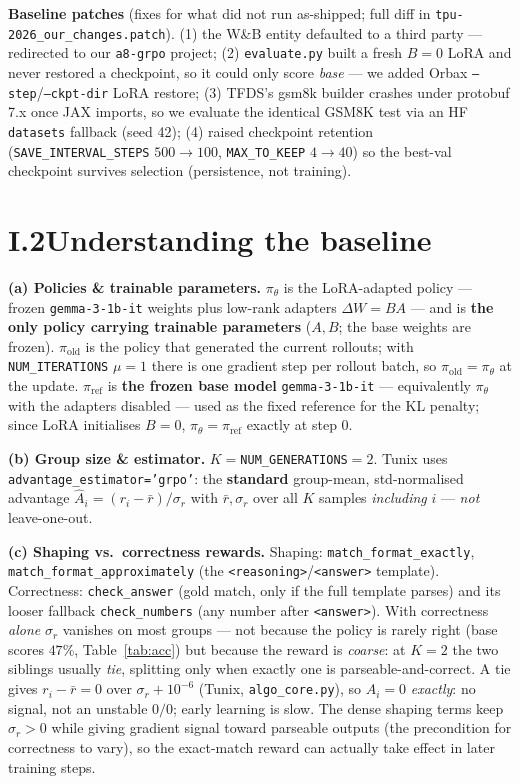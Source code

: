 \documentclass[11pt]{article}
\newcommand{\code}[1]{\texttt{#1}}
\begin{document}
\textbf{Baseline patches} (fixes for what did not run as-shipped; full diff in \code{tpu-2026\_our\_changes.patch}).
(1) the W\&B entity defaulted to a third party --- redirected to our \code{a8-grpo} project;
(2) \code{evaluate.py} built a fresh $B{=}0$ LoRA and never restored a checkpoint, so it could only score \emph{base} --- we added Orbax
\code{--step}/\code{--ckpt-dir} LoRA restore;
(3) TFDS's gsm8k builder crashes under protobuf 7.x once JAX imports, so we evaluate the identical GSM8K test via an HF \code{datasets} fallback (seed 42);
(4) raised checkpoint retention (\code{SAVE\_INTERVAL\_STEPS} $500{\to}100$, \code{MAX\_TO\_KEEP} $4{\to}40$) so the best-val checkpoint survives selection (persistence, not training).

\section*{I.2\quad Understanding the baseline}
\textbf{(a) Policies \& trainable parameters.} $\pi_\theta$ is the LoRA-adapted policy --- frozen \code{gemma-3-1b-it} weights plus low-rank
adapters $\Delta W{=}BA$ --- and is \textbf{the only policy carrying trainable parameters} ($A,B$; the base weights are frozen). $\pi_{\mathrm{old}}$
is the policy that generated the current rollouts; with \code{NUM\_ITERATIONS} $\mu{=}1$ there is one gradient step per rollout batch, so
$\pi_{\mathrm{old}}{=}\pi_\theta$ at the update. $\pi_{\mathrm{ref}}$ is \textbf{the frozen base model} \code{gemma-3-1b-it} --- equivalently $\pi_\theta$
with the adapters disabled --- used as the fixed reference for the KL penalty; since LoRA initialises $B{=}0$, $\pi_\theta{=}\pi_{\mathrm{ref}}$ exactly at step 0.

\textbf{(b) Group size \& estimator.} $K{=}$\code{NUM\_GENERATIONS}$=2$. Tunix uses \code{advantage\_estimator='grpo'}: the \textbf{standard}
group-mean, std-normalised advantage $\hat A_i{=}(r_i-\bar r)/\sigma_r$ with $\bar r,\sigma_r$ over all $K$ samples \emph{including} $i$ --- \emph{not}
leave-one-out.

\textbf{(c) Shaping vs.\ correctness rewards.} Shaping: \code{match\_format\_exactly}, \code{match\_format\_approximately} (the
\code{<reasoning>}/\code{<answer>} template). Correctness: \code{check\_answer} (gold match, only if the full template parses) and its looser fallback \code{check\_numbers} (any number
after \code{<answer>}). With correctness \emph{alone} $\sigma_r$ vanishes on most groups --- not because the policy is rarely right (base scores $47\%$,
Table~\ref{tab:acc}) but because the reward is \emph{coarse}: at $K{=}2$ the two siblings usually \emph{tie}, splitting only when exactly one is
parseable-and-correct. A tie gives $r_i{-}\bar r{=}0$ over $\sigma_r{+}10^{-6}$ (Tunix, \code{algo\_core.py}), so $\hat A_i{=}0$ \emph{exactly}: no signal,
not an unstable $0/0$; early learning is slow. The dense shaping
terms keep $\sigma_r{>}0$ while giving gradient signal toward parseable outputs (the precondition for correctness to vary), so the exact-match
reward can actually take effect in later training steps.
\end{document}
